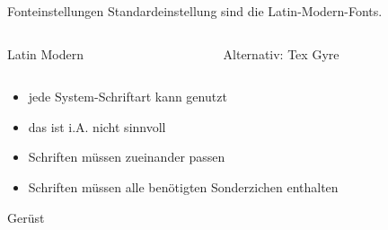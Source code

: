 \begin{frame}[fragile]{Fonteinstellungen}
    Standardeinstellung sind die Latin-Modern-Fonts. 
    \vspace{1em}
    \begin{columns}[c]
        \begin{column}{0.47\textwidth}
            \begin{block}{Latin Modern}
                \begin{lstverbatim}
                \usepackage{fontspec}
                \setmainfont{Latin Modern Roman}
                \setsansfont{Latin Modern Sans}
                \setmonofont{Latin Modern Mono}
                \end{lstverbatim}
            \end{block}
        \end{column}
        \begin{column}{0.47\textwidth}
            \begin{block}{Alternativ: Tex Gyre}
                \begin{lstverbatim}
                \usepackage{fontspec}
                \setmainfont{Tex Gyre Pagella}
                \setsansfont{Tex Gyre Heros}
                \setmonofont{Tex Gyre Cursor}
                \end{lstverbatim}
            \end{block}
        \end{column}
    \end{columns}
    \begin{itemize}
        \item jede System-Schriftart kann genutzt
        \item \alert{das ist i.A. nicht sinnvoll}
        \item Schriften müssen zueinander passen
        \item Schriften müssen alle benötigten Sonderzichen enthalten
    \end{itemize}
\end{frame}


\begin{frame}[fragile]{Gerüst}
\end{frame}

